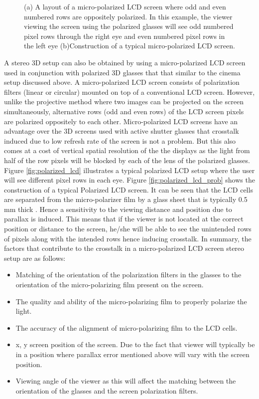 \begin{figure}[htbp]
    \caption{(a) A layout of a micro-polarized LCD screen where odd and even numbered rows are oppositely polarized. In this example, the viewer viewing the screen using the polarized glasses will see odd numbered pixel rows through the right eye and even numbered pixel rows in the left eye \cite{woods2012crosstalk} (b){Construction of a typical micro-polarized LCD screen}.\label{fig:LCD_polarized}}
\end{figure}
A stereo 3D setup can also be obtained by using a micro-polarized LCD screen used in conjunction with polarized 3D glasses that that similar to the cinema setup discussed above. A micro-polarized LCD screen consists of polarization filters (linear or circular) mounted on top of a conventional LCD screen. However, unlike the projective method where two images can be projected on the screen simultaneously, alternative rows (odd and even rows) of the LCD screen pixels are polarized oppositely to each other. Micro-polarized LCD screens have an advantage over the 3D screens used with active shutter glasses that crosstalk induced due to low refresh rate of the screen is not a problem. But this also comes at a cost of vertical spatial resolution of the the displays as the light from half of the row pixels will be blocked by each of the lens of the polarized glasses. Figure \ref{fig:polarized_lcd} illustrates a typical polarized LCD setup where the user will see different pixel rows in each eye. Figure \ref{fig:polarized_lcd_prob} shows the construction of a typical Polarized LCD screen. It can be seen that the LCD cells are separated from the micro-polarizer film by a glass sheet that is typically 0.5 mm thick \cite{woods2012crosstalk}. Hence a sensitivity to the viewing distance and position due to parallax is induced. This means that if the viewer is not located at the correct position or distance to the screen, he/she will be able to see the unintended rows of pixels along with the intended rows hence inducing crosstalk. In summary, the factors that contribute to the crosstalk in a micro-polarized LCD screen stereo setup are as follows:
\begin{itemize}
\item{Matching of the orientation of the polarization filters in the glasses to the orientation of the micro-polarizing film present on the screen.}
\item{The quality and ability of the micro-polarizing film to properly polarize the light.}
\item{The accuracy of the alignment of micro-polarizing film to the LCD cells.}
\item{x, y screen position of the screen. Due to the fact that viewer will typically be in a position where parallax error mentioned above will vary with the screen position.}
\item{Viewing angle of the viewer as this will affect the matching between the orientation of the glasses and the screen polarization filters.}
\end{itemize}

